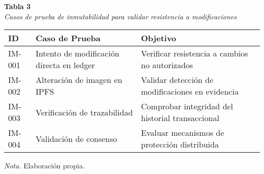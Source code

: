 \begin{table}[htbp]
    \begin{flushleft}
        \textbf{Tabla 3}\\[1em]
        \textit{Casos de prueba de inmutabilidad para validar resistencia a modificaciones}
    \end{flushleft}
    \vspace{1em}
    \centering
    \begin{tabular}{p{2cm} p{6cm} p{4cm}}
        \toprule
        \textbf{ID} & \textbf{Caso de Prueba} & \textbf{Objetivo} \\
        \midrule
        IM-001 & Intento de modificación directa en ledger & Verificar resistencia a cambios no autorizados \\
        IM-002 & Alteración de imagen en IPFS & Validar detección de modificaciones en evidencia \\
        IM-003 & Verificación de trazabilidad & Comprobar integridad del historial transaccional \\
        IM-004 & Validación de consenso & Evaluar mecanismos de protección distribuida \\
        \bottomrule
    \end{tabular}
    \vspace{1em}
    \begin{flushleft}
        \textit{Nota.} Elaboración propia.
    \end{flushleft}
    \label{tab:casos_prueba_inmutabilidad}
\end{table}

